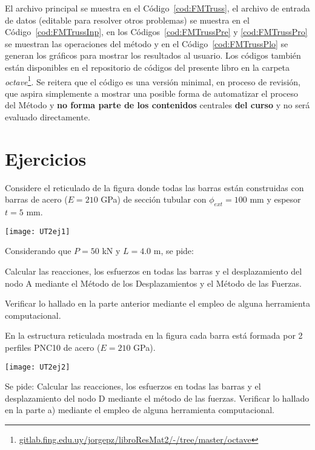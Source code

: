El archivo principal se muestra en el Código~\ref{cod:FMTruss}, el archivo de entrada de datos (editable para resolver otros problemas) se muestra en el Código~\ref{cod:FMTrussInp}, en los Códigos~\ref{cod:FMTrussPre} y \ref{cod:FMTrussPro} se muestran las operaciones del método y en el Código~\ref{cod:FMTrussPlo} se generan los gráficos para mostrar los resultados al usuario. %
%
Los códigos también están disponibles en el repositorio de códigos del presente libro en la carpeta \textit{octave}\footnote{\href{https://gitlab.fing.edu.uy/jorgepz/libroResMat2/-/tree/master/octave}{gitlab.fing.edu.uy/jorgepz/libroResMat2/-/tree/master/octave}}. %
%
Se reitera que el código es una versión minimal, en proceso de revisión, que aspira simplemente a mostrar una posible forma de automatizar el proceso del Método y  \textbf{no forma parte de los contenidos} centrales \textbf{del curso} y no será evaluado directamente. %
%


\newpage
\section{Ejercicios}
\setcounter{ejercicio}{0}

\ejercicio


Considere el reticulado de la figura donde todas las barras están construidas con barras de acero ($E=210$ GPa) de sección tubular con $\phi_{ext} =100$ mm y espesor $t=5$ mm. 

\begin{center}
\texttt{[image: UT2ej1]}
\end{center}

Considerando que $P=50$ kN y $L=4.0$ m, se pide:

\parte Calcular las reacciones, los esfuerzos en todas las barras y el desplazamiento del nodo A mediante el Método de los Desplazamientos y el Método de las Fuerzas.

\parte Verificar lo hallado en la parte anterior mediante el empleo de alguna herramienta computacional.




\ejercicio

En la estructura reticulada mostrada en la figura cada barra está formada por 2 perfiles PNC10 de acero ($E=210$ GPa).

\begin{center}
	\texttt{[image: UT2ej2]}
\end{center}

Se pide:
%
\parte Calcular las reacciones, los esfuerzos en todas las barras y el desplazamiento del nodo D mediante el método de las fuerzas.
%
\parte Verificar lo hallado en la parte a) mediante el empleo de alguna herramienta computacional.




